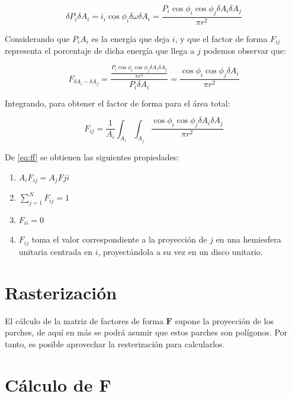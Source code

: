 \begin{equation}
    \delta{P}_{i}\delta{A_{i}} = i_{i} \cos{\phi_{i}}\delta{\omega}\delta{A_{i}} = \frac{P_{i}\cos{\phi_{i}}\cos{\phi_{j}}\delta{A_{i}}\delta{A_{j}}}{\pi r^{2}}
\end{equation}

Considerando que ${P}_{i}{A_{i}}$ es la energía que deja $i$, y que el factor de forma $F_{ij}$ representa el porcentaje
de dicha energía que llega a $j$ podemos observar que:

\begin{equation}
    F_{\delta{A_{i}}-\delta{A_{j}}} = \frac{\frac{P_{i}\cos{\phi_{i}}\cos{\phi_{j}}\delta{A_{i}}\delta{A_{j}}}{\pi r^{2}}}{P_{i}\delta{A_{i}}} = \frac{\cos{\phi_{i}}\cos{\phi_{j}}\delta{A_{i}}}{\pi{r^{2}}}
\end{equation}

Integrando, para obtener el factor de forma para el área total:

\begin{equation}
    F_{ij} = \frac{1}{A_{i}} \int_{A_{i}}\int_{A_{j}}\frac{\cos{\phi_{i}}\cos{\phi_{j}}\delta{A_{i}}\delta{A_{j}}}{\pi{r^{2}}} \label{eq:ff}    
\end{equation}

De \eqref{eq:ff} se obtienen las siguientes propiedades:
\begin{enumerate}
    \item $A_{i}F_{ij} = A_{j}F{ji}$
    \item $\sum_{j=1}^{N} F_{ij} = 1$
    \item $F_{ii} = 0$
    \item $F_{ij}$ toma el valor correspondiente a la proyección de $j$ en una hemiesfera unitaria centrada en $i$, proyectándola a su vez en un disco unitario.
\end{enumerate}

\section{Rasterización}
\label{sec:rasterizacion}

El cálculo de la matriz de factores de forma $\mathbf{F}$ supone la proyección de los parches, de aquí en más se podrá asumir que estos parches son polígonos. Por tanto, es posible aprovechar la resterización para calcularlos.

\section{Cálculo de $\mathbf{F}$}

